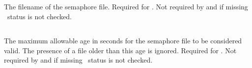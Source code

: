 \subsection{}
The filename of the semaphore file. Required for
. Not required by  and
if missing \ntp\ status is not checked.

\subsection{}
The maximum allowable age in seconds for the semaphore file to be
considered valid. The presence of a file older than this age is
ignored. Required for . Not required by
 and if missing \ntp\ status is not checked.




